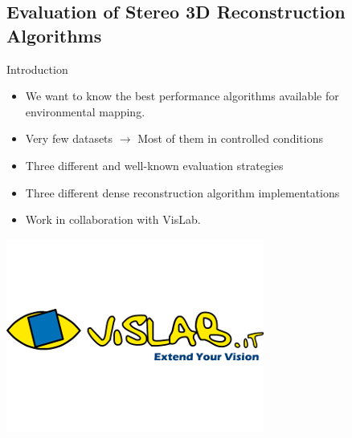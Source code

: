 \graphicspath{
  {./images/bmps/}{./images/vects/}{./images/}
  {./images/presentation/bmps/}{./images/presentation/vects/}{./images/presentation/}
  {./images/chapter00/bmps/}{./images/chapter00/vects/}{./images/chapter00/}
  {./images/chapter03/bmps/}{./images/chapter03/vects/}{./images/chapter03/}
}

\subsection{Evaluation of Stereo 3D Reconstruction Algorithms}
\begin{frame}{Introduction}
  \begin{itemize}
    \item We want to know the best performance algorithms available for environmental mapping.
    \item Very few datasets $\rightarrow$ Most of them in controlled conditions
    \item Three different and well-known evaluation strategies
    \item Three different dense reconstruction algorithm implementations
    \item Work in collaboration with VisLab.
  \end{itemize}
  \begin{center}
    \includegraphics[height=0.4\textheight]{vislab_logo}
  \end{center}
  
\end{frame}

